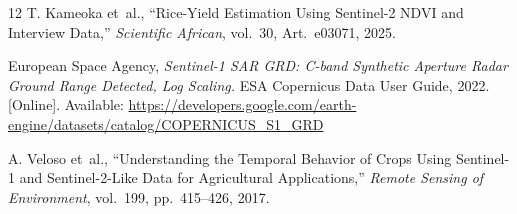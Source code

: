\documentclass[conference]{IEEEtran}
\begin{document}
\begin{thebibliography}{12}
T. Kameoka et~al., ``Rice-Yield Estimation Using Sentinel-2 NDVI and
Interview Data,'' \textit{Scientific African}, vol.~30, Art.\ e03071, 2025.

European Space Agency, \textit{Sentinel-1 SAR GRD: C-band Synthetic Aperture
Radar Ground Range Detected, Log Scaling.} ESA Copernicus Data User Guide,
2022. [Online]. Available:
\url{https://developers.google.com/earth-engine/datasets/catalog/COPERNICUS_S1_GRD}

A. Veloso et~al., ``Understanding the Temporal Behavior of Crops Using
Sentinel-1 and Sentinel-2-Like Data for Agricultural Applications,''
\textit{Remote Sensing of Environment}, vol.~199, pp.~415--426, 2017.

\end{thebibliography}
\end{document}
